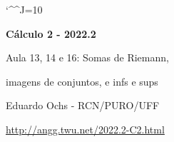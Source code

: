 \documentclass[oneside,12pt]{article}
\begin{document}
\catcode`\^^J=10
\pu
\def\pictgridstyle{\color{GrayPale}\linethickness{0.3pt}}
\def\pictaxesstyle{\linethickness{0.5pt}}
\def\pictnaxesstyle{\color{GrayPale}\linethickness{0.5pt}}
\celllower=2.5pt


\def\u#1{\par{\footnotesize \url{#1}}}

\def\drafturl{http://angg.twu.net/LATEX/2022-2-C2.pdf}
\def\drafturl{http://angg.twu.net/2022.2-C2.html}
\def\draftfooter{\tiny \href{\drafturl}{\jobname{}} \ColorBrown{\shorttoday{} \hours}}

\def\V{\mathbf{V}}
\def\F{\mathbf{F}}

\def\Rext{\overline{\R}}


%

\thispagestyle{empty}

\begin{center}

\vspace*{1.2cm}

{\bf \Large Cálculo 2 - 2022.2}

\bsk

Aula 13, 14 e 16: Somas de Riemann,

imagens de conjuntos, e infs e sups

\bsk

Eduardo Ochs - RCN/PURO/UFF

\url{http://angg.twu.net/2022.2-C2.html}

\end{center}

\newpage

\end{document}
